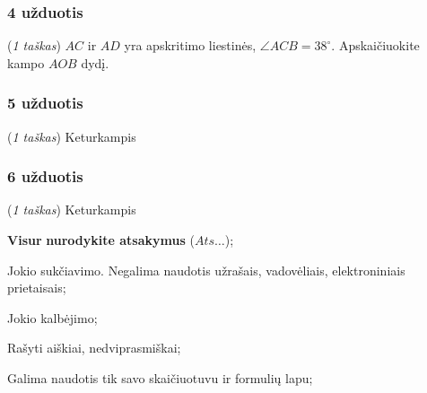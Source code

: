 \documentclass[a4paper]{article}
\begin{document}
\subsubsection*{4 užduotis}

\begin{minipage}[t]{0.27\textwidth}
      \centering
\end{minipage}\hfill
\begin{minipage}{0.69\textwidth}
      (\textit{1 taškas}) $AC$ ir $AD$ yra apskritimo liestinės, $\angle ACB =
            38^\circ$. Apskaičiuokite kampo $AOB$ dydį.
\end{minipage}

\subsubsection*{5 užduotis}

\begin{minipage}[t]{0.25\textwidth}
      \centering
\end{minipage}\hfill
\begin{minipage}{0.69\textwidth}
      (\textit{1 taškas}) Keturkampis 
\end{minipage}

\subsubsection*{6 užduotis}

\begin{minipage}[t]{0.22\textwidth}
      \centering
\end{minipage}\hfill
\begin{minipage}{0.69\textwidth}
      (\textit{1 taškas}) Keturkampis 
\end{minipage}

\vfill
\begin{small}
      \begin{enumerate*}[label={(\arabic*)}]
            \item \textbf{Visur} \textbf{nurodykite atsakymus} ($Ats\ldots$);
            \item Jokio sukčiavimo. Negalima naudotis užrašais, vadovėliais,
            elektroniniais prietaisais;
            \item Jokio kalbėjimo;
            \item Rašyti aiškiai, nedviprasmiškai;
            \item Galima naudotis tik savo skaičiuotuvu ir formulių lapu;
      \end{enumerate*}
\end{small}
\end{document}
